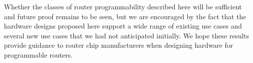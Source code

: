 Whether the classes of router programmability described here will be sufficient
and future proof remains to be seen, but we are encouraged by the fact that the
hardware designs proposed here support a wide range of existing use cases and
several new use cases that we had not anticipated initially. We hope these
results provide guidance to router chip manufacturers when designing hardware
for programmable routers.
